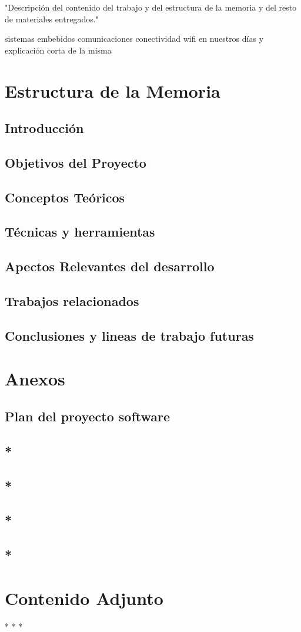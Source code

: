 
"Descripción del contenido del trabajo y del estructura de la memoria y del resto de materiales entregados."

sistemas embebidos
comunicaciones
conectividad wifi en nuestros días y explicación corta de la misma

\section{Estructura de la Memoria}
\subsection{Introducción}
\subsection{Objetivos del Proyecto}
\subsection{Conceptos Teóricos}
\subsection{Técnicas y herramientas}
\subsection{Apectos Relevantes del desarrollo}
\subsection{Trabajos relacionados}
\subsection{Conclusiones y lineas de trabajo futuras}


\section{Anexos}
\subsection{Plan del proyecto software}
\subsection{*}
\subsection{*}
\subsection{*}
\subsection{*}


\section{Contenido Adjunto}
*
*
*


